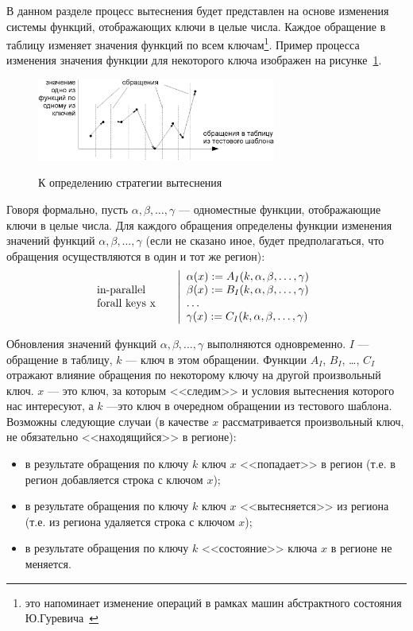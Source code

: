 В данном разделе процесс вытеснения будет представлен на основе изменения  системы функций, отображающих ключи в целые числа. Каждое обращение в таблицу изменяет значения функций по всем ключам\footnote{это напоминает изменение операций в рамках машин абстрактного состояния Ю.Гуревича~\cite{ASM}}. Пример процесса изменения значения функции для некоторого ключа изображен на рисунке~\ref{fig:graphic}.

\begin{figure}[h] \center
  \includegraphics[width=0.7\textwidth]{2.theor/graphic}\\
  \caption{К определению стратегии вытеснения}\label{fig:graphic}
\end{figure}

Говоря формально, пусть $\alpha, \beta, \dots, \gamma$ --- одноместные функции,
отображающие ключи в целые числа. Для каждого обращения определены функции
изменения значений функций $\alpha, \beta, \dots, \gamma$ (если не сказано иное, будет предполагаться, что обращения осуществляются в один и тот же регион):
$$\parbox{2.5cm}{in-parallel\\forall keys x~}\left|\begin{array}{l}
\alpha(x) := A_I(k, \alpha, \beta, \dots, \gamma)\\
\beta(x) := B_I(k, \alpha, \beta, \dots, \gamma)\\
\dots\\
\gamma(x) := C_I(k, \alpha, \beta, \dots, \gamma)\\
\end{array}\right.
$$

Обновления значений функций $\alpha, \beta, \dots, \gamma$ выполняются одновременно. $I$ --- обращение в таблицу, $k$ --- ключ в этом обращении. Функции $A_I$, $B_I$, \dots, $C_I$ отражают влияние обращения по некоторому ключу на другой произвольный ключ. $x$ --- это ключ, за которым <<следим>> и условия вытеснения которого нас интересуют, а $k$ ---это ключ в очередном обращении из тестового шаблона.
Возможны следующие случаи (в качестве $x$ рассматривается произвольный ключ, не
обязательно <<находящийся>> в регионе):
\begin{itemize}
    \item в результате обращения по ключу $k$ ключ $x$ <<попадает>> в регион (т.е. в регион добавляется строка с ключом $x$);
    \item в результате обращения по ключу $k$ ключ $x$ <<вытесняется>> из региона (т.е. из региона удаляется строка с ключом $x$);
    \item в результате обращения по ключу $k$ <<состояние>> ключа $x$ в регионе не меняется.
\end{itemize}

